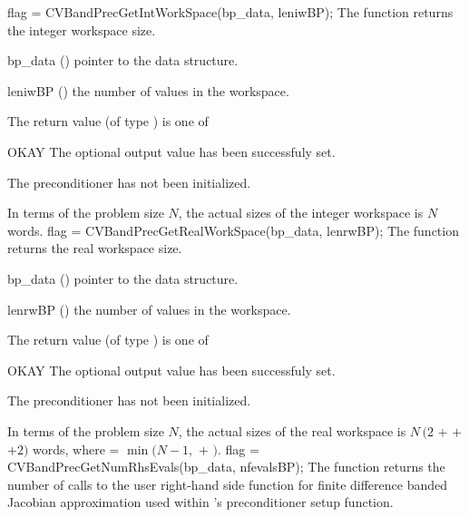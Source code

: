 {
  flag = CVBandPrecGetIntWorkSpace(bp\_data, leniwBP);
}
{
  The function  returns the
  {\cvbandpre} integer workspace size.
}
{
  \begin{args}[leniwBP]
  \item[bp\_data] ()
    pointer to the {\cvbandpre} data structure.
  \item[leniwBP] ()
    the number of  values in the {\cvbandpre} workspace.
  \end{args}
}
{
  The return value  (of type ) is one of
  \begin{args}[BP\_NO\_DATA]
  \item[OKAY] 
    The optional output value has been successfuly set.
  \item[\Id{BP\_NO\_DATA}]
    The {\cvbandpre} preconditioner has not been initialized.
  \end{args}
}
{
  In terms of the problem size $N$, the actual sizes of the integer workspace
  is $N$  words.
}
{
  flag = CVBandPrecGetRealWorkSpace(bp\_data, lenrwBP);
}
{
  The function  returns the
  {\cvbandpre} real workspace size.
}
{
  \begin{args}[lenrwBP]
  \item[bp\_data] ()
    pointer to the {\cvbandpre} data structure.
  \item[lenrwBP] ()
    the number of  values in the {\cvbandpre} workspace.
  \end{args}
}
{
  The return value  (of type ) is one of
  \begin{args}[BP\_NO\_DATA]
  \item[OKAY] 
    The optional output value has been successfuly set.
  \item[\Id{BP\_NO\_DATA}]
    The {\cvbandpre} preconditioner has not been initialized.
  \end{args}
}
{
  In terms of the problem size $N$, the actual sizes of the real workspace is
  $N\,(2$  $+$  $+$  $+2)$  words,
  where  = $\min(N-1 ,$  $+$ $)$.
}
{
  flag = CVBandPrecGetNumRhsEvals(bp\_data, nfevalsBP);
}
{
  The function  returns the
  number of calls to the user right-hand side function for
  finite difference banded Jacobian approximation used within
  {\cvbandpre}'s preconditioner setup function.
}
